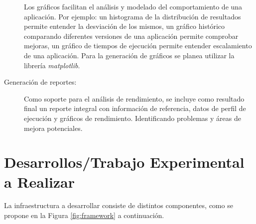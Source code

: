 \documentclass[a4paper]{article}
\begin{document}
\begin{description}
Los gráficos facilitan el análisis y modelado del comportamiento de una aplicación. Por ejemplo: un histograma de la distribución de resultados permite entender la desviación de los mismos, un gráfico histórico comparando diferentes versiones de una aplicación permite comprobar mejoras, un gráfico de tiempos de ejecución permite entender escalamiento de una aplicación. Para la generación de gráficos se planea utilizar la librería {\it matplotlib}.

\item[Generación de reportes:]

Como soporte para el análisis de rendimiento, se incluye como resultado final un reporte integral con información de referencia, datos de perfil de ejecución y gráficos de rendimiento. Identificando problemas y áreas de mejora potenciales. 

\end{description}

\section{Desarrollos/Trabajo Experimental a Realizar}

La infraestructura a desarrollar consiste de distintos componentes, como se propone en la Figura \ref{fig:framework} a continuación.
\end{document}

